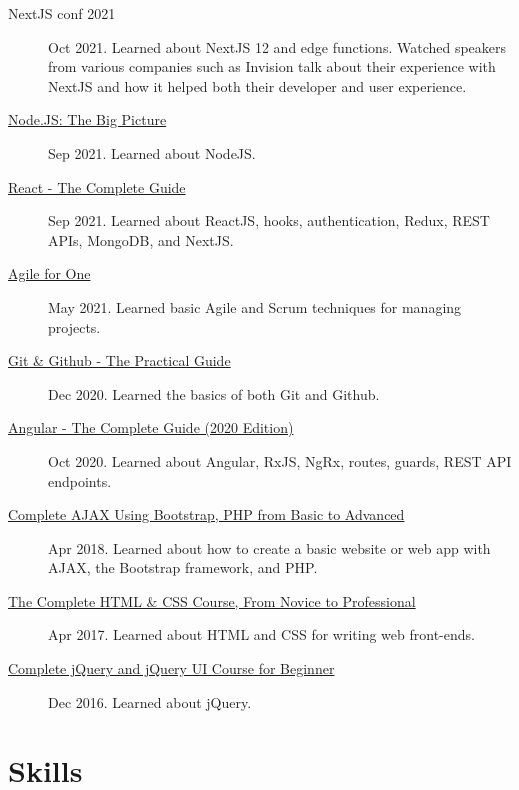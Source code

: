 \documentclass{article}
\begin{document}
\begin{description}
  \item[NextJS conf 2021] Oct 2021. Learned about NextJS 12 and edge functions. Watched speakers from various companies such as Invision talk about their experience with NextJS and how it helped both their developer and user experience.
  \item[\href{https://sirkoik.github.io/CurriculumVitae/certifications/Nodejs-The-Big-Picture/certificate.pdf}{Node.JS: The Big Picture}] Sep 2021. Learned about NodeJS.
  \item[\href{https://www.udemy.com/certificate/UC-2196f0cf-2dce-4a11-9d8e-421827506ad1/}{React - The Complete Guide}] Sep 2021. Learned about ReactJS, hooks, authentication, Redux, REST APIs, MongoDB, and NextJS.
  \item[\href{https://sirkoik.github.io/CurriculumVitae/certifications/Agile-for-One/certificate.pdf}{Agile for One}] May 2021. Learned basic Agile and Scrum techniques for managing projects.
  \item[\href{https://sirkoik.github.io/CurriculumVitae/certifications/certificate-of-completion-for-git-github-the-practical-guide.pdf}{Git \& Github - The Practical Guide}] Dec 2020. Learned the basics of both Git and Github.
  \item[\href{https://www.udemy.com/certificate/UC-624f6f83-940e-428f-accd-d16113661ded}{Angular - The Complete Guide (2020 Edition)}] Oct 2020. Learned about Angular, RxJS, NgRx, routes, guards, REST API endpoints.
  \item[\href{https://www.udemy.com/certificate/UC-E3EMJE4O}{Complete AJAX Using Bootstrap, PHP from Basic to Advanced}] Apr 2018. Learned about how to create a basic website or web app with AJAX, the Bootstrap framework, and PHP.
  \item[\href{https://www.udemy.com/certificate/UC-QZDWYX3V}{The Complete HTML \& CSS Course, From Novice to Professional}] Apr 2017. Learned about HTML and CSS for writing web front-ends.
  \item[\href{https://www.udemy.com/certificate/UC-4V285L2N}{Complete jQuery and jQuery UI Course for Beginner}] Dec 2016. Learned about jQuery.
\end{description}

\section{Skills}
\end{document}
